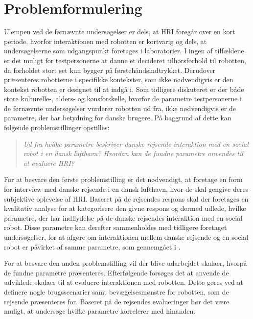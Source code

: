 \section{Problemformulering}
\label{Problemformulering}
%
Ulempen ved de førnævnte undersøgelser er dels, at HRI foregår over en kort periode, hvorfor interaktionen med robotten er kortvarig og dels, at undersøgelserne som udgangspunkt foretages i laboratorier. I ingen af tilfældene er det muligt for testpersonerne at danne et decideret tilhørsforhold til robotten, da forholdet stort set kun bygger på førstehåndsindtrykket. Derudover præsenteres robotterne i specifikke kontekster, som ikke nødvendigvis er den kontekst robotten er designet til at indgå i. Som tidligere diskuteret er der både store kulturelle-, alders- og kønsforskelle, hvorfor de parametre testpersonerne i de førnævnte undersøgelser vurderer robotten ud fra, ikke nødvendigvis er de parametre, der har betydning for danske brugere. På baggrund af dette kan følgende problemstillinger opstilles:\blankline
%
\begin{quotation}
	\noindent
	\textit{Ud fra hvilke parametre beskriver danske rejsende interaktion med en social robot i en dansk lufthavn?\blankline
		Hvordan kan de fundne parametre anvendes til at evaluere HRI?}\blankline
\end{quotation}
%
For at besvare den første problemstilling er det nødvendigt, at foretage en form for interview med danske rejsende i en dansk lufthavn, hvor de skal gengive deres subjektive oplevelse af HRI. Baseret på de rejsendes respons skal der foretages en kvalitativ analyse for at kategorisere den givne respons og dermed udlede, hvilke parametre, der har indflydelse på de danske rejsendes interaktion med en social robot. Disse parametre kan derefter sammenholdes med tidligere foretaget undersøgelser, for at afgøre om interaktionen mellem danske rejsende og en social robot er påvirket af samme parametre, som gennemgået i . 

For at besvare den anden problemstilling vil der blive udarbejdet skalaer, hvorpå de fundne parametre præsenteres. Efterfølgende forsøges det at anvende de udviklede skalaer til at evaluere interaktionen med robotten. Dette gøres ved at definere nogle brugsscenarier samt bevægelsesmønstre for robotten, som de rejsende præsenteres for. Baseret på de rejsendes evalueringer bør det være muligt, at undersøge hvilke parametre korrelerer med hinanden. 


